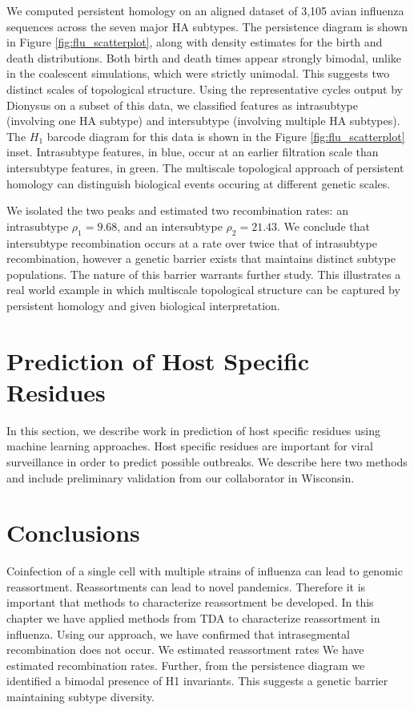 We computed persistent homology on an aligned dataset of 3,105 avian influenza sequences across the seven major HA subtypes.
The persistence diagram is shown in Figure \ref{fig:flu_scatterplot}, along with density estimates for the birth and death distributions.
Both birth and death times appear strongly bimodal, unlike in the coalescent simulations, which were strictly unimodal.
This suggests two distinct scales of topological structure.
Using the representative cycles output by Dionysus on a subset of this data, we classified features as intrasubtype (involving one HA subtype) and intersubtype (involving multiple HA subtypes).
The $H_1$ barcode diagram for this data is shown in the Figure \ref{fig:flu_scatterplot} inset.
Intrasubtype features, in blue, occur at an earlier filtration scale than intersubtype features, in green.
The multiscale topological approach of persistent homology can distinguish biological events occuring at different genetic scales.

We isolated the two peaks and estimated two recombination rates: an intrasubtype $\rho_{1}=9.68$, and an intersubtype $\rho_{2}=21.43$.
We conclude that intersubtype recombination occurs at a rate over twice that of intrasubtype recombination, however a genetic barrier exists that maintains distinct subtype populations.
The nature of this barrier warrants further study.
This illustrates a real world example in which multiscale topological structure can be captured by persistent homology and given biological interpretation.

\section{Prediction of Host Specific Residues}
\label{flu:flumarker}

In this section, we describe work in prediction of host specific residues using machine learning approaches.
Host specific residues are important for viral surveillance in order to predict possible outbreaks.
We describe here two methods and include preliminary validation from our collaborator in Wisconsin.

\section{Conclusions}
\label{flu:conclusions}

Coinfection of a single cell with multiple strains of influenza can lead to genomic reassortment.
Reassortments can lead to novel pandemics.
Therefore it is important that methods to characterize reassortment be developed.
In this chapter we have applied methods from TDA to characterize reassortment in influenza.
Using our approach, we have confirmed that intrasegmental recombination does not occur.
We estimated reassortment rates
We have estimated recombination rates.
Further, from the persistence diagram we identified a bimodal presence of H1 invariants.
This suggests a genetic barrier maintaining subtype diversity.




